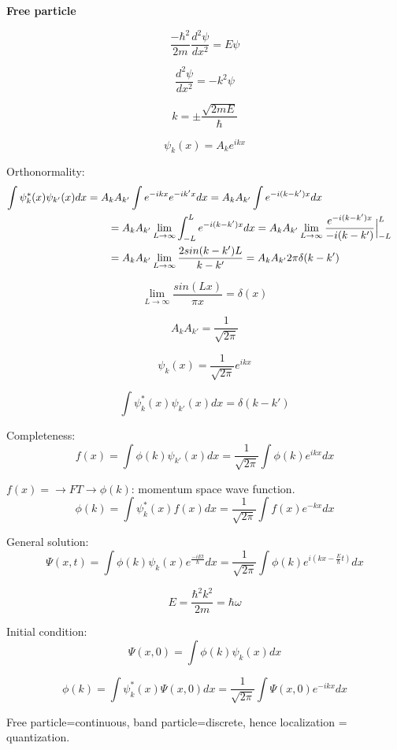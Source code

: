 \documentclass[12pt,a4paper]{article}
\begin{document}
\textbf{Free particle}

\[
\frac{-\hbar ^2}{2m} \frac{d^2 \psi}{dx^2} = E\psi
\]

\[
\frac{d^2 \psi}{dx^2} = -k^2 \psi
\]

\[
k= \pm \frac{\sqrt{2mE}}{\hbar}
\]

\[
\psi _k (x)=A_k e^{ikx}
\]

Orthonormality:
\begin{align}
  \phantom{\int \psi _k ^* (x) \psi _{k'} (x)dx}
    &\begin{aligned}
     \mathllap{\int \psi _k ^* (x) \psi _{k'} (x)dx} &= A_k A_{k'} \int e^{-ikx} e^{-ik'x} dx=A_k A_{k'} \int e^{-i(k-k')x}dx \\
     &\qquad = A_k A_{k'} \lim_{L\to \infty} \int_{-L}^{L} e^{-i(k-k')x} dx = A_k A_{k'} \lim_{L\to \infty} \frac{e^{-i(k-k')x}}{-i(k-k')}\Bigr | _{-L}^{L}\\
     &\qquad = A_k A_{k'} \lim_{L\to \infty} \frac{2sin(k-k')L}{k-k'} = A_k A_{k'} 2 \pi \delta (k-k')
     \end{aligned}
\end{align}

\[
\lim_{L\to \infty} \frac{sin(Lx)}{\pi x} = \delta (x)
\]

\[
A_k A_{k'}=\frac{1}{\sqrt{2\pi}}
\]

\[
\psi _k (x)= \frac{1}{\sqrt{2\pi}} e^{ikx}
\]

\[
\int \psi _k ^* (x) \psi_{k'} (x) dx = \delta (k-k')
\]

Completeness:
\[
f(x)=\int \phi(k)\psi_{k'}(x)dx= \frac{1}{\sqrt{2\pi}} \int \phi(k) e^{ikx} dx
\]

$f(x)= \to FT \to \phi(k)$: momentum space wave 
function.\\

\[
\phi(k)= \int \psi _k ^* (x) f(x)dx=\frac{1}{\sqrt{2\pi}} \int f(x) e^{-kx} dx
\]

General solution:
\[
\Psi (x,t)= \int \phi(k) \psi_k(x) e^{\frac{-iEt}{\hbar}} dx =\frac{1}{\sqrt{2\pi}} \int \phi(k) e^{i(kx-\frac{E}{\hbar} t)}dx
\]

\[
E=\frac{\hbar ^2 k^2}{2m}=\hbar \omega
\]

Initial condition:
\[
\Psi(x,0)= \int \phi(k) \psi_k(x) dx
\]

\[
\phi(k)= \int \psi _k ^*(x) \Psi(x,0) dx =\frac{1}{\sqrt{2\pi}} \int \Psi(x,0) e^{-ikx} dx
\]

Free particle=continuous, band particle=discrete, hence localization = quantization.\\
\end{document}
